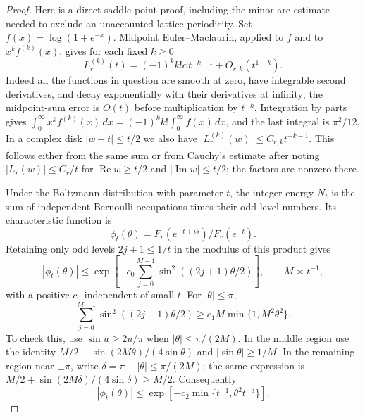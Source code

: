 \begin{proof}
Here is a direct saddle-point proof, including the minor-arc estimate
needed to exclude an unaccounted lattice periodicity.
Set $f(x)=\log(1+e^{-x})$.  Midpoint Euler--Maclaurin, applied to
$f$ and to $x^k f^{(k)}(x)$, gives for each fixed $k\geq0$
\begin{equation}\label{eq:partition-derivatives}
 L_r^{(k)}(t)=(-1)^k k!c\,t^{-k-1}+O_{r,k}(t^{1-k}).
\end{equation}
Indeed all the functions in question are smooth at zero, have
integrable second derivatives, and decay exponentially with their
derivatives at infinity; the midpoint-sum error is $O(t)$ before
multiplication by $t^{-k}$.  Integration by parts gives
$\int_0^\infty x^k f^{(k)}(x)\,dx=(-1)^k k!\int_0^\infty f(x)\,dx$,
and the last integral is $\pi^2/12$.
In a complex disk $|w-t|\leq t/2$ we also have
$|L_r^{(k)}(w)|\leq C_{r,k}t^{-k-1}$.
This follows either from the same sum or from Cauchy's estimate after
noting $|L_r(w)|\leq C_r/t$ for $\operatorname{Re}w\geq t/2$ and
$|\operatorname{Im}w|\leq t/2$; the factors are nonzero there.

Under the Boltzmann distribution with parameter $t$, the integer
energy $N_t$ is the sum of independent Bernoulli occupations times
their odd level numbers.  Its characteristic function is
\[
 \phi_t(\theta)=F_r(e^{-t+i\theta})/F_r(e^{-t}) .
\]
Retaining only odd levels $2j+1\leq1/t$ in the modulus of this product
gives
\[
 |\phi_t(\theta)|\leq
 \exp\!\left[-c_0\sum_{j=0}^{M-1}
              \sin^2((2j+1)\theta/2)\right],\qquad M\asymp t^{-1},
\]
with a positive $c_0$ independent of small $t$.  For $|\theta|\leq\pi$,
\begin{equation}\label{eq:odd-lattice-bound}
 \sum_{j=0}^{M-1}\sin^2((2j+1)\theta/2)
 \geq c_1 M\min\{1,M^2\theta^2\}.
\end{equation}
To check this, use $\sin u\geq2u/\pi$ when
$|\theta|\leq\pi/(2M)$.  In the middle region use the identity
$M/2-\sin(2M\theta)/(4\sin\theta)$ and
$|\sin\theta|\geq1/M$.  In the remaining region near $\pm\pi$,
write $\delta=\pi-|\theta|\leq\pi/(2M)$; the same expression is
$M/2+\sin(2M\delta)/(4\sin\delta)\geq M/2$.
Consequently
\begin{equation}\label{eq:characteristic-tail}
 |\phi_t(\theta)|\leq
       \exp[-c_2\min\{t^{-1},\theta^2t^{-3}\}].
\end{equation}


\end{proof}
